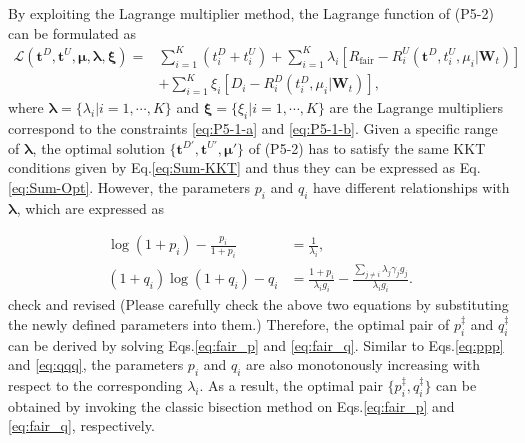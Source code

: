 \documentclass[12pt,draftcls,onecolumn,journal]{IEEEtran}
\begin{document}
By exploiting the Lagrange multiplier method, the Lagrange function of (P5-2) can be formulated as
\begin{align}
	\mathcal{L}(\mathbf{t}^D,\mathbf{t}^U,\boldsymbol{\mu},\boldsymbol{\lambda},\boldsymbol{\xi}) = &\sum_{i=1}^{K}{(t_i^D+t_i^U)} +\sum_{i=1}^{K}{\lambda_{i}[R_{\text{fair}}-R_i^U(\mathbf{t}^D,t_i^U,\mu_i | \mathbf{W}_t)]} \nonumber \\
& +\sum_{i=1}^{K}\xi_i[D_i-R_i^D(t_i^D,\mu_i | \mathbf{W}_t)],
\end{align}
where $\boldsymbol{\lambda} = \{\lambda_i | i=1,\cdots,K\}$ and $\boldsymbol{\xi} = \{\xi_i | i = 1,\cdots,K\}$ are the Lagrange multipliers correspond to the constraints \eqref{eq:P5-1-a} and \eqref{eq:P5-1-b}. Given a specific range of $\boldsymbol{\lambda}$, the optimal solution $\{\mathbf{t}^{D'}, \mathbf{t}^{U'}, \boldsymbol{\mu}'\}$ of (P5-2) has to satisfy the same KKT conditions given by Eq.\eqref{eq:Sum-KKT} and thus they can be expressed as Eq.\eqref{eq:Sum-Opt}. However, the parameters $p_i$ and $q_i$ have different relationships with $\boldsymbol{\lambda}$, which are expressed as

\begin{align}
	 \log(1+p_i)-\frac{p_i}{1+p_i}&=\frac{1}{\lambda_i}, \label{eq:fair_p}\\ 
 (1+q_i)\log(1+q_i)-q_i&=\frac{1+p_i}{\lambda_i g_i}-\frac{\sum_{j \neq i}\lambda_j\gamma_jg_j}{\lambda_ig_i}. \label{eq:fair_q}
\end{align}
\cbstart check and revised \cbend
{\color{red}(Please carefully check the above two equations by substituting the newly defined parameters into them.)} Therefore, the optimal pair of $p_i^{\ddagger}$ and $q_i^{\ddagger}$ can be derived by solving Eqs.\ref{eq:fair_p} and \eqref{eq:fair_q}. Similar to Eqs.\eqref{eq:ppp} and \eqref{eq:qqq}, the parameters $p_i$ and $q_i$ are also monotonously increasing with respect to the corresponding $\lambda_i$. As a result, the optimal pair $\{p_i^{\ddagger},q_i^{\ddagger}\}$ can be obtained by invoking the classic bisection method on Eqs.\ref{eq:fair_p} and \eqref{eq:fair_q}, respectively. 
\end{document}

